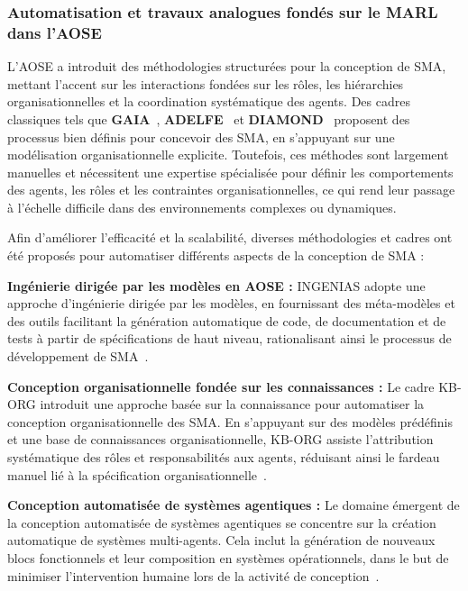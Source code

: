 \subsubsection{Automatisation et travaux analogues fondés sur le MARL dans l'AOSE}\label{sub-sec:rel_aose_automate_marl}

L'AOSE a introduit des méthodologies structurées pour la conception de SMA, mettant l'accent sur les interactions fondées sur les rôles, les hiérarchies organisationnelles et la coordination systématique des agents. Des cadres classiques tels que \textbf{GAIA}~\cite{gaia1998}, \textbf{ADELFE}~\cite{adelfe2002} et \textbf{DIAMOND}~\cite{Jamont2005} proposent des processus bien définis pour concevoir des SMA, en s'appuyant sur une modélisation organisationnelle explicite. Toutefois, ces méthodes sont largement manuelles et nécessitent une expertise spécialisée pour définir les comportements des agents, les rôles et les contraintes organisationnelles, ce qui rend leur passage à l'échelle difficile dans des environnements complexes ou dynamiques.

Afin d'améliorer l'efficacité et la scalabilité, diverses méthodologies et cadres ont été proposés pour automatiser différents aspects de la conception de SMA :

\textbf{Ingénierie dirigée par les modèles en AOSE :} INGENIAS adopte une approche d'ingénierie dirigée par les modèles, en fournissant des méta-modèles et des outils facilitant la génération automatique de code, de documentation et de tests à partir de spécifications de haut niveau, rationalisant ainsi le processus de développement de SMA~\cite{pavon2005agent}.

\textbf{Conception organisationnelle fondée sur les connaissances :} Le cadre KB-ORG introduit une approche basée sur la connaissance pour automatiser la conception organisationnelle des SMA. En s'appuyant sur des modèles prédéfinis et une base de connaissances organisationnelle, KB-ORG assiste l'attribution systématique des rôles et responsabilités aux agents, réduisant ainsi le fardeau manuel lié à la spécification organisationnelle~\cite{dignum2001kb}.

\textbf{Conception automatisée de systèmes agentiques :} Le domaine émergent de la conception automatisée de systèmes agentiques se concentre sur la création automatique de systèmes multi-agents. Cela inclut la génération de nouveaux blocs fonctionnels et leur composition en systèmes opérationnels, dans le but de minimiser l'intervention humaine lors de la activité de conception~\cite{smith2024automated}.

